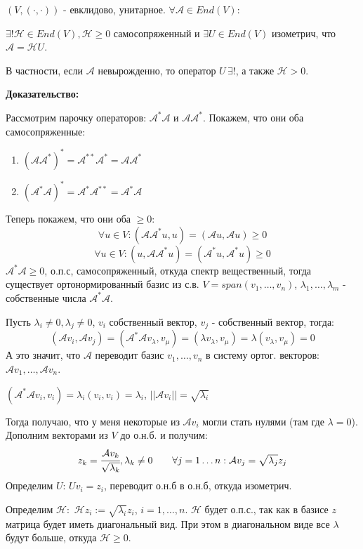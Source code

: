 $(V, (\cdot,\cdot))$ - евклидово, унитарное. $\forall \mathcal{A} \in End(V):$

$\exists! \mathcal{H} \in End(V), \mathcal{H}\geq 0$ самосопряженный и $\exists U \in End(V)$ изометрич, что $\mathcal{A} = \mathcal{H}U$.

В частности, если $\mathcal{A}$ невырожденно, то оператор $U \, \exists!$, а также $\mathcal{H} >0$.

\textbf{Доказательство:}

Рассмотрим парочку операторов: $\mathcal{A}^* \mathcal{A}$ и $\mathcal{A}\mathcal{A}^*$. Покажем, что они оба самосопряженные:
\begin{enumerate}
    \item $(\mathcal{A}\mathcal{A}^*)^* = \mathcal{A}^{**}\mathcal{A}^* = \mathcal{A}\mathcal{A}^*$
     \item $(\mathcal{A}^*\mathcal{A})^* = \mathcal{A}^{*}\mathcal{A}^{**} = \mathcal{A}^*\mathcal{A}$
\end{enumerate}
Теперь покажем, что они оба $\geq 0$:
$$\forall u \in V: (\mathcal{AA}^*u,u)=(\mathcal{A}u, \mathcal{A}u) \geq  0$$
$$\forall u \in V: (u,\mathcal{AA}^*u)=(\mathcal{A}^*u, \mathcal{A}^*u) \geq  0$$
$\mathcal{A}^*\mathcal{A} \geq 0$, о.п.с, самосопряженный, откуда спектр вещественный, тогда существует ортонормированный базис из с.в. $V  =span(v_1,\ldots,v_n)$, $\lambda_1,\ldots,\lambda_m$ - собственные числа  $\mathcal{A}^*\mathcal{A}$.


Пусть $\lambda_i \neq 0, \lambda_j \neq 0$, $v_i$ собственный вектор, $v_j$ - собственный вектор, тогда:
$$(\mathcal{A} v_i, \mathcal{A}v_j)=(\mathcal{A}^* \mathcal{A} v_\lambda , v_\mu) = (\lambda v_\lambda,v_\mu) = \lambda (v_\lambda, v_\mu) = 0$$
А это значит, что $\mathcal{A}$ переводит базис $v_1,\ldots, v_n$ в систему ортог. векторов: $\mathcal{A}v_1,\ldots, \mathcal{A}v_n$.

$(\mathcal{A}^*\mathcal{A}v_i,v_i) = \lambda_i (v_i,v_i) = \lambda_i$, $||\mathcal{A}v_i|| = \sqrt{\lambda_i}$

Тогда получаю, что у меня некоторые из $\mathcal{A}v_i$ могли стать нулями (там где $\lambda = 0$). Дополним векторами из $V$ до о.н.б. и получим:
$$ z_k = \cfrac{\mathcal{A}v_k}{\sqrt{\lambda_k}}, \lambda_k \neq 0 \quad \quad
\forall j = 1\ldots n: \mathcal{A}v_j = \sqrt{\lambda_j} z_j$$
Определим $U$: $Uv_i = z_i$, переводит о.н.б в о.н.б, откуда изометрич.

Определим $\mathcal{H}:$ $\mathcal{H}z_i := \sqrt{\lambda_i}z_i$, $i = 1,\ldots, n$.  $\mathcal{H}$ будет о.п.с., так как в базисе $z$ матрица будет иметь диагональный вид. При этом в диагональном виде все $\lambda$ будут больше, откуда $\mathcal{H}\geq 0$.

